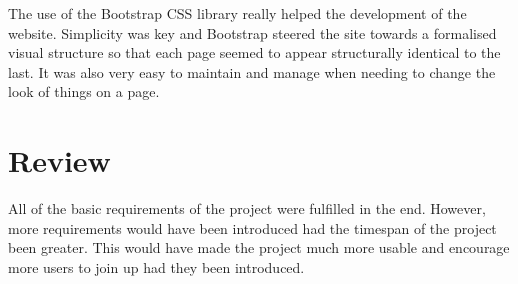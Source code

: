 	The use of the Bootstrap CSS library really helped the development of the website. Simplicity was key and Bootstrap steered the site towards a formalised visual structure so that each page seemed to appear structurally identical to the last. It was also very easy to maintain and manage when needing to change the look of things on a page.

\section{Review}
	All of the basic requirements of the project were fulfilled in the end. However, more requirements would have been introduced had the timespan of the project been greater. This would have made the project much more usable and encourage more users to join up had they been introduced.
